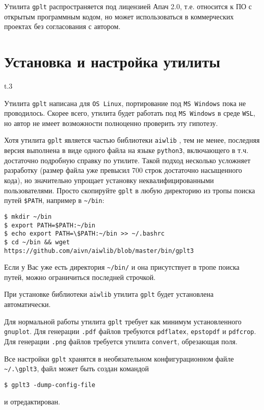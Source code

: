 \documentclass[12pt]{article}
\def\gplt{{\tt gplt}}
\def\gnuplot{{\tt gnuplot}}
\def\python{{\tt python3}}
\def\png{{\tt .png}}
\def\pdf{{\tt .pdf}}
\begin{document}
Утилита \gplt{} распространяется под лицензией Апач 2.0, т.е. относится к ПО с открытым программным кодом, но может использоваться в коммерческих проектах
без согласования с автором.

\section{Установка  и настройка утилиты}
\begin{wrapfigure}{t}{.3\textwidth}
  \vphantom{.}
  \vspace{-3cm}

\end{wrapfigure}
Утилита \gplt{} написана для \verb'OS Linux', портирование под \verb'MS Windows' пока не проводилось. Скорее всего, утилита будет работать
под \verb'MS Windows' в среде \verb'WSL', но автор не имеет возможности полноценно проверить эту гипотезу.

Хотя утилита \gplt{} является частью библиотеки \verb'aiwlib' \cite{aiwlib:SR:PP2018,aiwlib:SV2018,aiwlib:git},
тем не менее, последняя версия выполнена в виде одного файла на языке \python, включающего в т.ч. достаточно подробную справку по утилите.
Такой подход несколько усложняет разработку (размер файла уже превысил 700 строк достаточно насыщенного кода), но значительно упрощает установку
неквалифицированными пользователями. Просто скопируйте \gplt{} в любую директорию из тропы поиска путей \verb'$PATH', например в \verb'~/bin':
\begin{verbatim}
$ mkdir ~/bin
$ export PATH=$PATH:~/bin
$ echo export PATH=\$PATH:~/bin >> ~/.bashrc
$ cd ~/bin && wget https://github.com/aivn/aiwlib/blob/master/bin/gplt3 
\end{verbatim}
Если у Вас уже есть директория \verb'~/bin/' и она присутствует в тропе поиска путей, можно ограничиться последней строчкой.

При установке библиотеки \verb'aiwlib' утилита \gplt{} будет установлена автоматически.

Для нормальной работы утилита \gplt{} требует как минимум установленного \gnuplot. Для генерации \pdf{} файлов требуются \verb'pdflatex', \verb'epstopdf'
и \verb'pdfcrop'. Для генерации \png{} файлов требуется утилита \verb'convert', обрезающая поля.

Все настройки \gplt{} хранятся в необязательном конфигурационном файле  \verb'~/.\gplt3',
файл может быть создан командой
\begin{verbatim}
$ gplt3 -dump-config-file
\end{verbatim}
и отредактирован.\\
\end{document}
